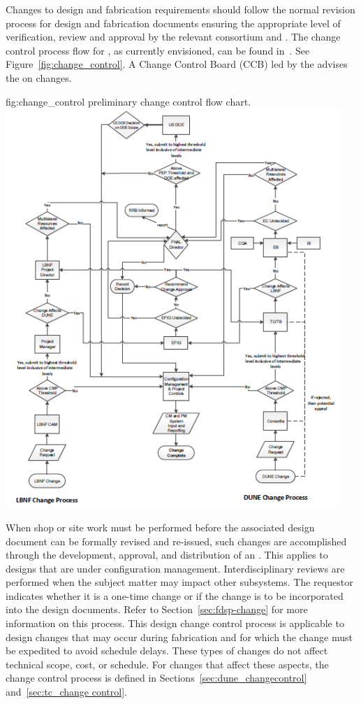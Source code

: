 Changes to design and fabrication requirements should follow the
normal revision process for design and fabrication documents ensuring
the appropriate level of verification, review and approval by the
relevant consortium and . The change control process flow for
, as currently envisioned, can be found in~\cite{bib:docdb82}. 
See Figure~\ref{fig:change_control}. 
A Change Control Board (CCB)
led by the  advises the  on changes.
\begin{dunefigure}{fig:change_control}
  { preliminary change control flow chart.}%
  \includegraphics[width=0.95\textwidth]{graphics/LBNF-DUNE_ChangeControl_4-1}
\end{dunefigure}


When shop or site work must be performed before the associated %
design
document can be formally revised and re-issued, such changes are
accomplished through the development, approval, and distribution of an
. This applies to %
designs that are
under configuration management. Interdisciplinary reviews are
performed when the  subject matter may impact other
subsystems. The  requestor  indicates whether it is a one-time
change or if the change is to be incorporated into the design
documents. Refer to Section~\ref{sec:fdsp-change} for more information on this
process.  This design change control process is applicable to design
changes that may occur during fabrication and for which the change must be
expedited to avoid schedule delays. These types of changes do not
affect technical scope, cost, or schedule. For changes that affect these aspects, 
the change control process is defined in
Sections~\ref{sec:dune_changecontrol} and~\ref{sec:tc_change control}.

